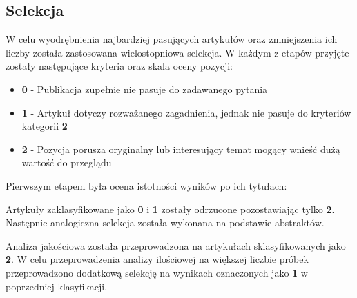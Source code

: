 \subsection{Selekcja}
W celu wyodrębnienia najbardziej pasujących artykułów oraz zmniejszenia ich liczby została zastosowana wielostopniowa selekcja. W każdym z etapów przyjęte zostały następujące kryteria oraz skala oceny pozycji:
\begin{itemize}
    \item {\bf 0} - Publikacja zupełnie nie pasuje do zadawanego pytania
    \item {\bf 1} - Artykuł dotyczy rozważanego zagadnienia, jednak nie pasuje do kryteriów kategorii {\bf 2}
    \item {\bf 2} - Pozycja porusza oryginalny lub interesujący temat mogący wnieść dużą wartość do przeglądu
\end{itemize}
Pierwszym etapem była ocena istotności wyników po ich tytułach:

Artykuły zaklasyfikowane jako {\bf0} i {\bf1} zostały odrzucone pozostawiając tylko {\bf2}. Następnie analogiczna selekcja została wykonana na podstawie abstraktów.

Analiza jakościowa została przeprowadzona na artykułach sklasyfikowanych jako \textbf{2}. W celu przeprowadzenia analizy ilościowej na większej liczbie próbek przeprowadzono dodatkową selekcję na wynikach oznaczonych jako \textbf{1} w poprzedniej klasyfikacji.

